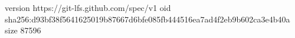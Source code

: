 version https://git-lfs.github.com/spec/v1
oid sha256:d93bf38f5641625019b87667d6bfe085fb444516ea7ad4f2eb9b602ca3e4b40a
size 87596

